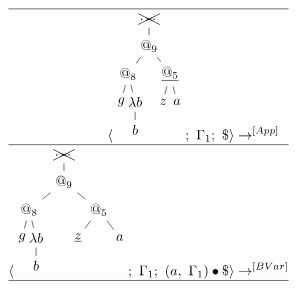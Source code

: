 \documentclass[a4paper, 10pt]{article}
\begin{document}
\begin{align*}
  \hline
  \langle \begin{tikzpicture}[sibling distance=3em,level distance=2em]
    \node {\xcancel{$\dots$}}
    child { node {$@_9$}
      child { node {$@_8$}[sibling distance=1em]
        child { node {$g$}}
        child { node {$\lambda b$}
          child { node {$b$}}}}
      child { node {$\underline{@_5}$}[sibling distance=1em]
        child { node {$z$}}
        child { node {$a$}}}};
  \end{tikzpicture};\ \Gamma_1;\ \$ \rangle & \rightarrow^{[App]}\\
  \hline
  \langle \begin{tikzpicture}[sibling distance=5em,level distance=2em]
    \node {\xcancel{$\dots$}}
    child { node {$@_9$}
      child { node {$@_8$}[sibling distance=1em]
        child { node {$g$}}
        child { node {$\lambda b$}
          child { node {$b$}}}}
      child { node {$@_5$}[sibling distance=3em]
        child { node {$\underline{z}$}}
        child { node {$a$}}}};
  \end{tikzpicture};\ \Gamma_1;\ (a,\ \Gamma_1) \bullet \$ \rangle & \rightarrow^{[BVar]} \\
  \hline
\end{align*}
\end{document}
